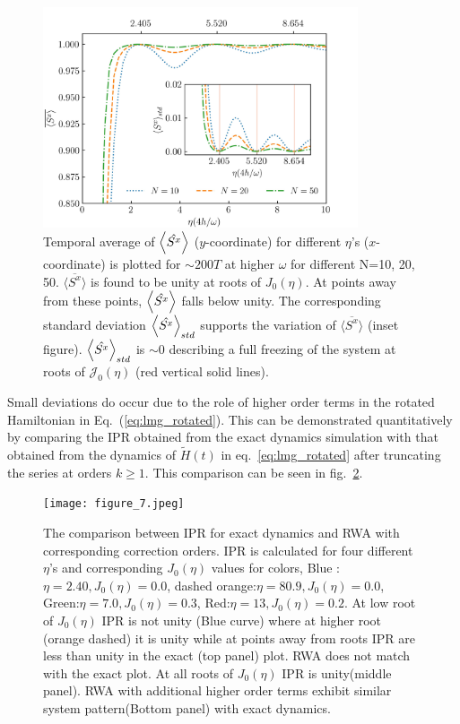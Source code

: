 \documentclass[%
reprint,
superscriptaddress,
amsmath,amssymb,
aps,
prb,
showkeys,
]{revtex4-2}
\begin{document}
\begin{figure}[t!]
	\centering
	\includegraphics[width=9.3cm]{figure_6.jpeg}
	\caption{Temporal average of $\expval{\hat{S^x}}$ ($y$-coordinate) for different $\eta$'s ($x$-coordinate) is plotted for $\sim 200T$ at higher $\omega$ for different N=10, 20, 50. $\overline{\langle S^x \rangle}$ is found to be unity at roots of $J_0(\eta)$. At points away from these points, $\expval{\hat{S^x}}$ falls below unity. The corresponding standard deviation $\expval{\hat{S^x}}_{std}$ supports the variation of $\overline{\langle S^x \rangle}$ (inset figure). $\expval{\hat{S^x}}_{std}$ is $\sim 0$ describing a full freezing of the system at roots of $\mathcal{J}_0(\eta)$ (red vertical solid lines).}
	\label{fig:sx_conserve}
\end{figure}
Small deviations do occur due to the role of  higher order terms in the rotated Hamiltonian in Eq.~(\ref{eq:lmg_rotated}). This can be demonstrated quantitatively by comparing the IPR obtained from the exact dynamics simulation with that obtained from the dynamics of $\tilde{H}(t)$ in eq.~\ref{eq:lmg_rotated} after truncating the series at orders $k\geq 1$. This comparison can be seen in fig.~\ref{fig:lmg_ipr_rwa11}.
\begin{figure}[t!]
	\centering
	\texttt{[image: figure\_7.jpeg]}
	\caption{The comparison between IPR for exact dynamics and RWA with corresponding correction orders. IPR is calculated for four different $\eta$'s and corresponding $J_0(\eta)$ values for colors, Blue :$\eta = 2.40, J_0(\eta) = 0.0$, dashed orange:$\eta = 80.9, J_0(\eta) = 0.0$, Green:$\eta =7.0, J_0(\eta) = 0.3$, Red:$\eta = 13, J_0(\eta)= 0. 2$. At low root of $J_0(\eta)$ IPR is not unity (Blue curve) where at higher root (orange dashed) it is unity while at points away from roots IPR are less than unity in the exact (top panel) plot. RWA does not match with the exact plot. At all roots of $J_0(\eta)$ IPR is unity(middle panel). RWA with additional higher order terms exhibit similar system pattern(Bottom panel) with exact dynamics.}
	\label{fig:lmg_ipr_rwa11}
\end{figure}
\end{document}
